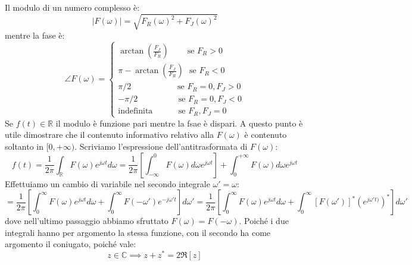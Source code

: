 \documentclass{book}
\begin{document}
                Il modulo di un numero complesso è:
                \begin{equation}
                    |F(\omega)| = \sqrt{F_{R}(\omega)^{2}+F_{J}(\omega)^{2}}
                \end{equation}
                mentre la fase è:
                \begin{equation}
                    \angle F(\omega) = \begin{cases}
                        \arctan(\frac{F_{J}}{F_{R}}) \ \ \ \ \ \ \ \ \ \ \textrm{se }  F_{R}>0 \\
                        \pi - \arctan(\frac{F_{J}}{F_{R}}) \ \ \ \textrm{se }  F_{R}<0 \\
                        \pi/2 \qquad \qquad \ \  \  \ \ \ \   \textrm{se } F_{R} = 0, F_{J}>0 \\
                        -\pi/2 \qquad \qquad \ \ \  \   \textrm{se } F_{R} = 0, F_{J}<0 \\
                        \textrm{indefinita} \qquad \ \ \ \ \  \textrm{se } F_{R},F_{J}=0
                    \end{cases}
                \end{equation}
        Se $f(t) \in \mathbb{R}$ il modulo è funzione pari mentre la fsae è dispari. A questo punto è utile dimostrare che il contenuto informativo relativo alla $F(\omega)$ è contenuto soltanto in $[0, + \infty)$. Scriviamo l'espressione dell'antitrasformata di $F(\omega)$:
        \begin{equation}
            f(t) = \frac{1}{2 \pi} \int_{\mathbb{R}} F(\omega) e^{j \omega t}d \omega = \frac{1}{2 \pi} [\int_{- \infty}  ^{0} F(\omega) d \omega e^{j \omega t}] + \int_{0} ^{+\infty} F(\omega) d \omega e^{j \omega t}
        \end{equation}
        Effettuiamo un cambio di variabile nel secondo integrale $\omega ' = \omega$:
        \begin{equation}
            = \frac{1}{2 \pi} [ \int_{0} ^{\infty} F(\omega) e^{j \omega t} d \omega + \int_{0} ^{\infty} F(-\omega ') e^{- j \omega ' t}]d \omega '  = \frac{1}{2 \pi} [ \int_{0} ^{\infty} F(\omega) e^{j \omega t} d \omega + \int_{0} ^{\infty} [F(\omega ')]^{*} (e^{ j \omega ' t)})^{*}]d \omega '
        \end{equation}
        dove nell'ultimo passaggio abbiamo sfruttato $F(\omega) = F(-\omega)$. Poiché i due integrali hanno per argomento la stessa funzione, con il secondo ha come argomento il coniugato, poiché vale:
        \begin{equation}
            z \in \mathbb{C} \implies z + z^{*} = 2 \Re[z]
        \end{equation}
\end{document}
